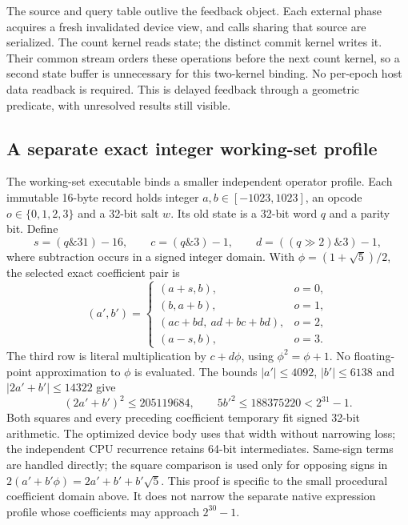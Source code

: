 The source and query table outlive the feedback object. Each external phase
acquires a fresh invalidated device view, and calls sharing that source are
serialized. The count kernel reads state; the distinct commit kernel writes
it. Their common stream orders these operations before the next count kernel,
so a second state buffer is unnecessary for this two-kernel binding. No
per-epoch host data readback is required. This is delayed feedback through a
geometric predicate, with unresolved results still visible.

\subsection{A separate exact integer working-set profile}
The working-set executable binds a smaller independent operator profile.
Each immutable 16-byte record holds integer $a,b\in[-1023,1023]$, an opcode
$o\in\{0,1,2,3\}$ and a 32-bit salt $w$. Its old state is a 32-bit word $q$
and a parity bit. Define
\begin{equation}
 s=(q\mathbin{\&}31)-16,\qquad
 c=(q\mathbin{\&}3)-1,\qquad
 d=((q\gg2)\mathbin{\&}3)-1,
\end{equation}
where subtraction occurs in a signed integer domain. With
$\phi=(1+\sqrt5)/2$, the selected exact coefficient pair is
\begin{equation}
 (a',b')=
 \begin{cases}
 (a+s,b),&o=0,\\
 (b,a+b),&o=1,\\
 (ac+bd,\ ad+bc+bd),&o=2,\\
 (a-s,b),&o=3.
 \end{cases}
 \label{eq:r15-working-phi}
\end{equation}
The third row is literal multiplication by $c+d\phi$, using
$\phi^2=\phi+1$. No floating-point approximation to $\phi$ is evaluated.
The bounds $|a'|\le4092$, $|b'|\le6138$ and
$|2a'+b'|\le14322$ give
\begin{equation}
 (2a'+b')^2\le205119684,\qquad
 5b'^2\le188375220<2^{31}-1.
 \label{eq:r15-working-sign32}
\end{equation}
Both squares and every preceding coefficient temporary fit signed 32-bit
arithmetic. The optimized device body uses that width without narrowing loss;
the independent CPU recurrence retains 64-bit intermediates.
Same-sign terms are handled directly; the square comparison is used only
for opposing signs in $2(a'+b'\phi)=2a'+b'+b'\sqrt5$.
This proof is specific to the small procedural coefficient domain above.
It does not narrow the separate native expression profile whose coefficients
may approach $2^{30}-1$.

